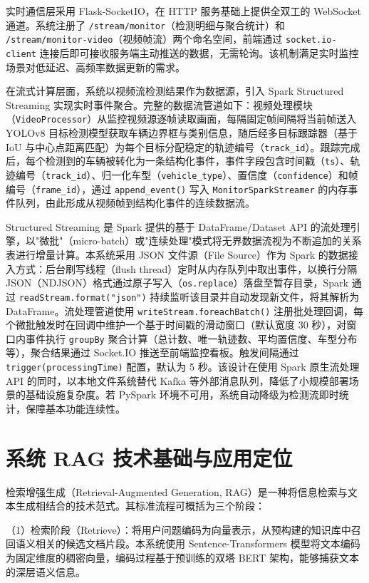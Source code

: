 \documentclass{wzuthesis} %
\begin{document}
实时通信层采用 Flask-SocketIO，在 HTTP 服务基础上提供全双工的 WebSocket 通道。系统注册了 \texttt{/stream/monitor}（检测明细与聚合统计）和 \texttt{/stream/monitor-video}（视频帧流）两个命名空间，前端通过 \texttt{socket.io-client} 连接后即可接收服务端主动推送的数据，无需轮询。该机制满足实时监控场景对低延迟、高频率数据更新的需求。

在流式计算层面，系统以视频流检测结果作为数据源，引入 Spark Structured Streaming 实现实时事件聚合。完整的数据流管道如下：视频处理模块（\texttt{VideoProcessor}）从监控视频源逐帧读取画面，每隔固定帧间隔将当前帧送入 YOLOv8 目标检测模型获取车辆边界框与类别信息，随后经多目标跟踪器（基于 IoU 与中心点距离匹配）为每个目标分配稳定的轨迹编号（\texttt{track\_id}）。跟踪完成后，每个检测到的车辆被转化为一条结构化事件，事件字段包含时间戳（\texttt{ts}）、轨迹编号（\texttt{track\_id}）、归一化车型（\texttt{vehicle\_type}）、置信度（\texttt{confidence}）和帧编号（\texttt{frame\_id}），通过 \texttt{append\_event()} 写入 \texttt{MonitorSparkStreamer} 的内存事件队列，由此形成从视频帧到结构化事件的连续数据流。

Structured Streaming 是 Spark 提供的基于 DataFrame/Dataset API 的流处理引擎，以"微批"（micro-batch）或"连续处理"模式将无界数据流视为不断追加的关系表进行增量计算。本系统采用 JSON 文件源（File Source）作为 Spark 的数据接入方式：后台刷写线程（flush thread）定时从内存队列中取出事件，以换行分隔 JSON（NDJSON）格式通过原子写入（\texttt{os.replace}）落盘至暂存目录，Spark 通过 \nolinkurl{readStream.format("json")} 持续监听该目录并自动发现新文件，将其解析为 DataFrame。流处理管道使用 \nolinkurl{writeStream.foreachBatch()} 注册批处理回调，每个微批触发时在回调中维护一个基于时间戳的滑动窗口（默认宽度 30 秒），对窗口内事件执行 \texttt{groupBy} 聚合计算（总计数、唯一轨迹数、平均置信度、车型分布等），聚合结果通过 Socket.IO 推送至前端监控看板。触发间隔通过 \nolinkurl{trigger(processingTime)} 配置，默认为 5 秒。该设计在使用 Spark 原生流处理 API 的同时，以本地文件系统替代 Kafka 等外部消息队列，降低了小规模部署场景的基础设施复杂度。若 PySpark 环境不可用，系统自动降级为检测流即时统计，保障基本功能连续性。

\section{系统 RAG 技术基础与应用定位}

检索增强生成（Retrieval-Augmented Generation, RAG）是一种将信息检索与文本生成相结合的技术范式。其标准流程可概括为三个阶段：

（1）检索阶段（Retrieve）：将用户问题编码为向量表示，从预构建的知识库中召回语义相关的候选文档片段。本系统使用 Sentence-Transformers 模型将文本编码为固定维度的稠密向量，编码过程基于预训练的双塔 BERT 架构，能够捕获文本的深层语义信息。
\end{document}
